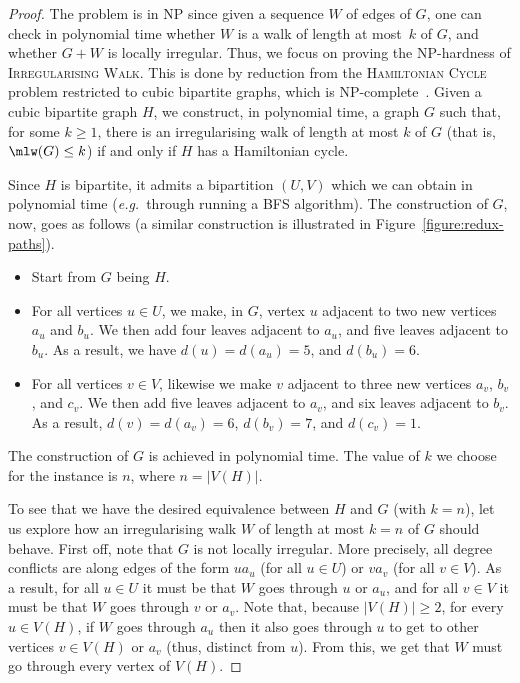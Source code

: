 \documentclass[a4paper,11pt,dvipsnames]{elsarticle}
\begin{document}
\begin{proof}
The problem is in \textsf{NP} since given a sequence $W$ of edges of $G$,
one can check in polynomial time whether $W$ is a walk of length at most~$k$ of $G$,
and whether $G+W$ is locally irregular. Thus, we focus on proving the \textsf{NP}-hardness of \textsc{Irregularising Walk}.
This is done by reduction from the \textsc{Hamiltonian Cycle} problem restricted to cubic bipartite graphs,
which is \textsf{NP}-complete~\cite{ANS80}.
Given a cubic bipartite graph $H$, we construct, in polynomial time,
a graph $G$ such that, for some $k \geq 1$, there is an irregularising walk of length at most $k$ of $G$ (that is, $\mlw(G) \leq k$) if and only if $H$ has a Hamiltonian cycle.

Since $H$ is bipartite, it admits a bipartition $(U,V)$ which we can obtain in polynomial time (\textit{e.g.}~through running a BFS algorithm). 
The construction of $G$, now, goes as follows (a similar construction is illustrated in Figure~\ref{figure:redux-paths}).

\begin{itemize}
	\item Start from $G$ being $H$. 
	
	\item For all vertices $u \in U$, we make, in $G$, vertex $u$ adjacent to two new vertices $a_u$ and $b_u$.
	We then add four leaves adjacent to $a_u$, and five leaves adjacent to $b_u$.
	As a result, we have $d(u)=d(a_u)=5$, and $d(b_u)=6$.
	
	\item For all vertices $v \in V$, likewise we make $v$ adjacent to three new vertices $a_v$, $b_v$, and $c_v$.
	We then add five leaves adjacent to $a_v$, and six leaves adjacent to $b_v$.
	As a result, $d(v)=d(a_v)=6$, $d(b_v)=7$, and $d(c_v)=1$.
\end{itemize}

\noindent The construction of $G$ is achieved in polynomial time. 
The value of $k$ we choose for the instance is $n$, where $n=|V(H)|$.

To see that we have the desired equivalence between $H$ and $G$ (with $k=n$), let us explore how an irregularising walk $W$ of length at most $k=n$ of $G$ should behave.
First off, note that $G$ is not locally irregular.
More precisely, all degree conflicts are along edges of the form $ua_u$ (for all $u \in U$) or $va_v$ (for all $v \in V$).
As a result, for all $u \in U$ it must be that $W$ goes through $u$ or $a_u$, and for all $v \in V$ it must be that $W$ goes through $v$ or $a_v$. Note that, because $|V(H)|\ge2$, for every $u\in V(H)$, if $W$ goes through $a_u$ then it also goes through $u$ to get to other vertices $v\in V(H)$ or $a_v$ (thus, distinct from $u$).
From this, we get that $W$ must go through every vertex of $V(H)$.



\end{proof}
\end{document}
